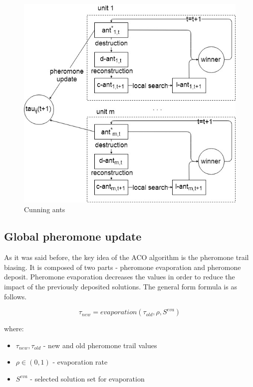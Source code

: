 \documentclass[11pt,a4paper,oneside]{book}
\begin{document}
\begin{figure}[h]
  \centering
    \includegraphics[scale=0.5]{cunning-ants.jpg}
  \caption{Cunning ants}
  \label{fig:cunning-ants}
\end{figure}


\subsection{Global pheromone update}
As it was said before, the key idea of the ACO algorithm is the pheromone trail biasing. It is composed of two parts - pheromone evaporation and pheromone deposit. Pheromone evaporation decreases the values in order to reduce the impact of the previously deposited solutions. The general form formula is as follows.

\begin{equation}
\tau_{new}=evaporation(\tau_{old}, \rho, S^{eva})
\end{equation}

where:
\begin{itemize}
\item $\tau_{new}, \tau_{old}$ - new and old pheromone trail values
\item $\rho \in (0,1)$ - evaporation rate
\item $S^{eva}$ - selected solution set for evaporation
\end{itemize}
\end{document}
